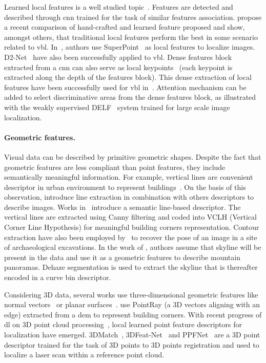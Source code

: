 	        Learned local features is a well studied topic~\citep{Carlevaris-Bianco2014,Paulin2015,Yi2016a,Ono2018a,Dusmanu2019,DeTone2017,Detone2018}. Features are detected and described through \ac{cnn} trained for the task of similar features association. \citet{Schonberger2017} propose a recent comparison of hand-crafted and learned feature proposed and show, amongst others, that traditional local features perform the best in some scenario related to \ac{vbl}. In~\cite{Sarlin2018a}, authors use SuperPoint~\citep{Detone2018} as local features to localize images. D2-Net~\citep{Dusmanu2019} have also been successfully applied to \ac{vbl}. Dense features block extracted from a \ac{cnn} can also serve as local keypoints~\citep{Widya2018} (each keypoint is extracted along the depth of the features block). This dense extraction of local features have been successfully used for \ac{vbl} in~\citep{Piasco2019a,Taira2018}. Attention mechanism can be added to select discriminative areas from the dense features block, as illustrated with the weakly supervised DELF~\citep{Noh2017} system trained for large scale image localization.

		\paragraph{Geometric features.}
		 	Visual data can be described by primitive geometric shapes. Despite the fact that geometric features are less compliant than point features, they include semantically meaningful information. For example, vertical lines are convenient descriptor in urban environment to represent buildings~\citep{Arth2015,Morago2016,Ramalingam2011}. On the basis of this observation, \citet{Hays2008} introduce line extraction in combination with others descriptors to describe images. Works in~\citep{Cham2010} introduce a semantic line-based descriptor. The vertical lines are extracted using Canny filtering and coded into VCLH (Vertical Corner Line Hypothesis) for meaningful building corners representation. Contour extraction have also been employed by~\citet{Russell2011} to recover the pose of an image in a site of archaeological excavations. In the work of \citet{Baatz2012}, authors assume that skyline will be present in the data and use it as a geometric features to describe mountain panoramas. Dehaze segmentation is used to extract the skyline that is thereafter encoded in a curve bin descriptor.
		 	
		 	Considering 3D data, several works use three-dimensional geometric features like normal vectors~\citep{Li2016} or planar surfaces~\citep{Fernandez-Moral2013}. \citet{Bansal2014} use PointRay (\ie a 3D vectors aligning with an edge) extracted from a \ac{dem} to represent building corners. With recent progress of \ac{dl} on 3D point cloud processing~\citep{Qi2016a}, local learned point feature descriptors for localization have emerged. 3DMatch~\citep{Zeng2016}, 3DFeat-Net~\citep{Yew2018} and PPFNet~\citep{Deng2018} are a 3D point descriptor trained for the task of 3D points to 3D points registration and used to localize a laser scan within a reference point cloud.
			
